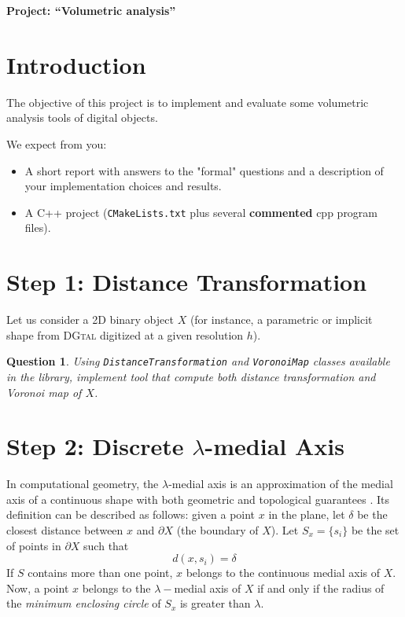 \documentclass[a4paper, 11pt]{article}
\title{}
\author{}
\date{}
\newtheorem{qu}{Question}
\begin{document}
\begin{center}
	\LARGE \textbf{Project: ``Volumetric analysis''}
\end{center}

\section*{Introduction} 

The objective of this project is to implement and evaluate some
volumetric analysis tools of digital objects. 

We expect from you:
\begin{itemize}
\item A short report with answers to the "formal" questions and a
  description of  your implementation choices and results.
\item A C++ project (\texttt{CMakeLists.txt} plus several
  \textbf{commented} cpp program files).
\end{itemize}


\section{Step 1: Distance Transformation}

Let us consider a 2D binary object $X$ (for instance, a parametric or implicit
shape from \textsc{DGtal} digitized at a given resolution $h$). 

\begin{qu}
  Using \texttt{DistanceTransformation} and \texttt{VoronoiMap}
  classes available in the library, implement tool that compute both
  distance transformation and Voronoi map of $X$.
\end{qu}

\section{Step 2: Discrete $\lambda$-medial Axis}

In computational geometry, the $\lambda$-medial axis is an
approximation of the medial axis of a continuous shape with both
geometric and topological guarantees \cite{Chazal2005}. Its definition
can be described as follows: given a point $x$ in the plane, let $\delta$
be the closest distance between $x$ and $\partial X$ (the boundary of
$X$). Let $S_x=\{s_i\}$ be the set of points in $\partial X$ such that
\begin{equation}
  d(x,s_i)=\delta
\end{equation}
If $S$ contains more than one point, $x$ belongs to the continuous
medial axis of $X$.  Now, a point $x$ belongs to the $\lambda-$medial
axis of $X$ if and only if the radius of the \emph{minimum enclosing
  circle} of $S_x$ is greater than $\lambda$.
\end{document}
